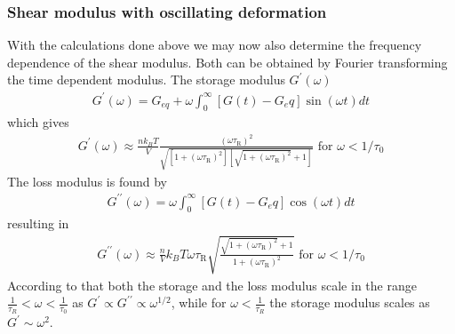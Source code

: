 \documentclass[letterpaper,10pt,english]{sphinxmanual}
\begin{document}
\subsubsection{Shear modulus with oscillating deformation}
\label{\detokenize{notebooks/L25/1_polymer_dynamics:Shear-modulus-with-oscillating-deformation}}
\sphinxAtStartPar
With the calculations done above we may now also determine the frequency dependence of the shear modulus. Both can be obtained by Fourier transforming the time dependent modulus. The storage modulus \(G^{\prime}(\omega)\)
\begin{equation*}
\begin{split}G^{\prime}(\omega)=G_{eq}+\omega \int_0^{\infty}[G(t)-G_eq]\sin(\omega t)dt\end{split}
\end{equation*}
\sphinxAtStartPar
which gives
\begin{equation*}
\begin{split}G^{\prime}(\omega) \approx \frac{n k_B T}{V} \frac{\left(\omega \tau_{\mathrm{R}}\right)^{2}}{\sqrt{\left[1+\left(\omega \tau_{\mathrm{R}}\right)^{2}\right]\left[\sqrt{1+\left(\omega \tau_{\mathrm{R}}\right)^{2}}+1\right]}} \text { for } \omega<1 / \tau_{0}\end{split}
\end{equation*}
\sphinxAtStartPar
The loss modulus is found by
\begin{equation*}
\begin{split}G^{\prime\prime}(\omega)=\omega \int_0^{\infty}[G(t)-G_eq]\cos(\omega t)dt\end{split}
\end{equation*}
\sphinxAtStartPar
resulting in
\begin{equation*}
\begin{split}G^{\prime \prime}(\omega) \approx \frac{n}{V} k_B T \omega \tau_{\mathrm{R}} \sqrt{\frac{\sqrt{1+\left(\omega \tau_{\mathrm{R}}\right)^{2}}+1}{1+\left(\omega \tau_{\mathrm{R}}\right)^{2}}} \text { for } \omega<1 / \tau_{0}\end{split}
\end{equation*}
\sphinxAtStartPar
According to that both the storage and the loss modulus scale in the range \(\frac{1}{\tau_R}<\omega<\frac{1}{\tau_0}\) as \(G^{\prime}\propto G^{\prime\prime}\propto \omega^{1/2}\), while for \(\omega<\frac{1}{\tau_R}\) the storage modulus scales as \(G^{\prime}\sim \omega^2\).

\sphinxAtStartPar
{}
\end{document}

